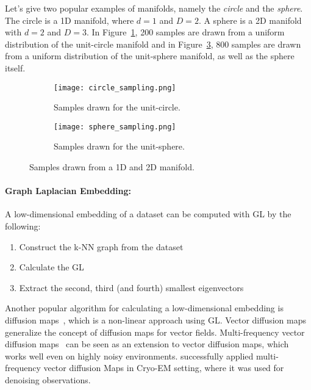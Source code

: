 Let's give two popular examples of manifolds, namely the \textit{circle} and the \textit{sphere}.
The circle is a 1D manifold, where $d=1$ and $D=2$. A sphere is a 2D manifold with $d=2$ and $D=3$.
In Figure~\ref{fig:circle_sampling}, 200 samples are drawn from a uniform distribution of the unit-circle manifold
and in Figure~\ref{fig:sphere_sampling}, 800 samples are drawn from a uniform distribution of the unit-sphere manifold,
as well as the sphere itself.



\begin{figure}[H]
    \captionsetup[subfigure]{justification=centering}
    \centering
    \begin{subfigure}[t]{0.4\textwidth}
        \texttt{[image: circle\_sampling.png]}
        \caption{Samples drawn for the unit-circle.}
        \label{fig:circle_sampling}
    \end{subfigure}\hfill
    \begin{subfigure}[t]{0.4\textwidth}
      \texttt{[image: sphere\_sampling.png]}
      \caption{Samples drawn for the unit-sphere.}
      \label{fig:sphere_sampling}
    \end{subfigure}\hfill
    \caption{Samples drawn from a 1D and 2D manifold.}
  \end{figure}


\paragraph{Graph Laplacian Embedding:}
\label{sec:manifold_calculation}
A low-dimensional embedding of a dataset can be computed with GL by the following:

\begin{enumerate}
    \item Construct the k-NN graph from the dataset
    \item Calculate the GL
    \item Extract the second, third (and fourth) smallest eigenvectors
\end{enumerate}

Another popular algorithm for calculating a low-dimensional embedding is diffusion maps~\cite{diffusionMaps}, 
which is a non-linear approach using GL.
Vector diffusion maps~\cite{vectorDiffusionMaps} generalize the concept of diffusion maps for vector fields.
Multi-frequency vector diffusion maps~\cite{multiDiffusionMaps} 
can be seen as an extension to vector diffusion maps, which works well even on highly noisy environments.
\citet{cryoEmMutliDM} successfully applied multi-frequency vector diffusion Maps in Cryo-EM setting,
 where it was used for denoising observations.



